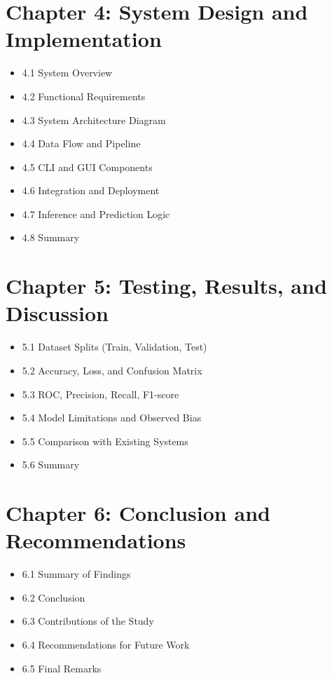 \documentclass[
  12pt,
  oneside]{article}
\providecommand{\tightlist}{%
  \setlength{\itemsep}{0pt}\setlength{\parskip}{0pt}}
\begin{document}
\newpage

\section{Chapter 4: System Design and
Implementation}\label{chapter-4-system-design-and-implementation}

\begin{itemize}
\tightlist
\item
  4.1 System Overview
\item
  4.2 Functional Requirements
\item
  4.3 System Architecture Diagram
\item
  4.4 Data Flow and Pipeline
\item
  4.5 CLI and GUI Components
\item
  4.6 Integration and Deployment
\item
  4.7 Inference and Prediction Logic
\item
  4.8 Summary
\end{itemize}

\newpage

\section{Chapter 5: Testing, Results, and
Discussion}\label{chapter-5-testing-results-and-discussion}

\begin{itemize}
\tightlist
\item
  5.1 Dataset Splits (Train, Validation, Test)
\item
  5.2 Accuracy, Loss, and Confusion Matrix
\item
  5.3 ROC, Precision, Recall, F1-score
\item
  5.4 Model Limitations and Observed Bias
\item
  5.5 Comparison with Existing Systems
\item
  5.6 Summary
\end{itemize}

\newpage

\section{Chapter 6: Conclusion and
Recommendations}\label{chapter-6-conclusion-and-recommendations}

\begin{itemize}
\tightlist
\item
  6.1 Summary of Findings
\item
  6.2 Conclusion
\item
  6.3 Contributions of the Study
\item
  6.4 Recommendations for Future Work
\item
  6.5 Final Remarks
\end{itemize}
\end{document}
